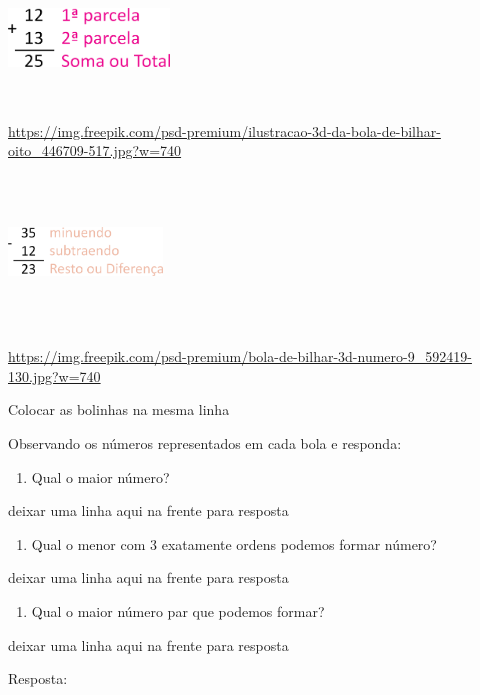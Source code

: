 \includegraphics[width=1.68333in,height=1.36449in]{media/image10.png}

\url{https://img.freepik.com/psd-premium/ilustracao-3d-da-bola-de-bilhar-oito_446709-517.jpg?w=740}

\includegraphics[width=1.61667in,height=1.60236in]{media/image11.png}

\url{https://img.freepik.com/psd-premium/bola-de-bilhar-3d-numero-9_592419-130.jpg?w=740}

Colocar as bolinhas na mesma linha

Observando os números representados em cada bola e responda:

\begin{enumerate}
\def\labelenumi{\alph{enumi})}
\item
  Qual o maior número?
\end{enumerate}

deixar uma linha aqui na frente para resposta

\begin{enumerate}
\def\labelenumi{\alph{enumi})}
\item
  Qual o menor com 3 exatamente ordens podemos formar número?
\end{enumerate}

deixar uma linha aqui na frente para resposta

\begin{enumerate}
\def\labelenumi{\alph{enumi})}
\item
  Qual o maior número par que podemos formar?
\end{enumerate}

deixar uma linha aqui na frente para resposta

Resposta:

